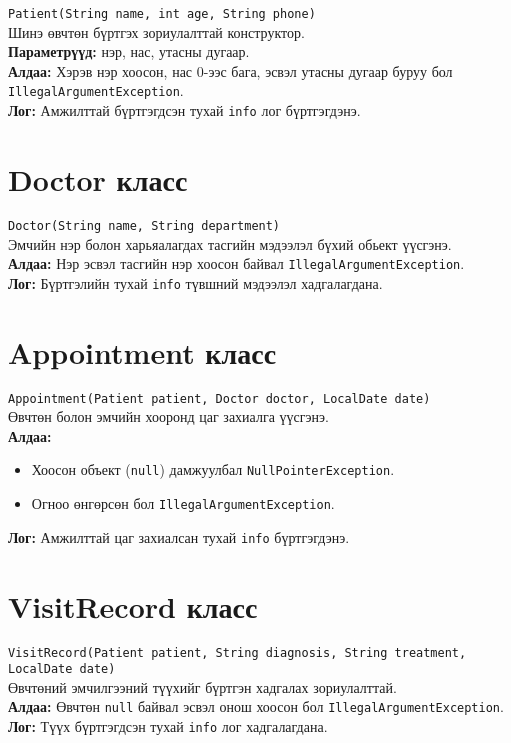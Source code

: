 \documentclass[12pt]{article}
\begin{document}
\texttt{Patient(String name, int age, String phone)} \\
Шинэ өвчтөн бүртгэх зориулалттай конструктор. \\
\textbf{Параметрүүд:} нэр, нас, утасны дугаар. \\
\textbf{Алдаа:} Хэрэв нэр хоосон, нас 0-ээс бага, эсвэл утасны дугаар буруу бол \texttt{IllegalArgumentException}. \\
\textbf{Лог:} Амжилттай бүртгэгдсэн тухай \texttt{info} лог бүртгэгдэнэ.

\section*{Doctor класс}

\texttt{Doctor(String name, String department)} \\
Эмчийн нэр болон харьяалагдах тасгийн мэдээлэл бүхий обьект үүсгэнэ. \\
\textbf{Алдаа:} Нэр эсвэл тасгийн нэр хоосон байвал \texttt{IllegalArgumentException}. \\
\textbf{Лог:} Бүртгэлийн тухай \texttt{info} түвшний мэдээлэл хадгалагдана.

\section*{Appointment класс}

\texttt{Appointment(Patient patient, Doctor doctor, LocalDate date)} \\
Өвчтөн болон эмчийн хооронд цаг захиалга үүсгэнэ. \\
\textbf{Алдаа:}
\begin{itemize}
    \item Хоосон объект (\texttt{null}) дамжуулбал \texttt{NullPointerException}.
    \item Огноо өнгөрсөн бол \texttt{IllegalArgumentException}.
\end{itemize}
\textbf{Лог:} Амжилттай цаг захиалсан тухай \texttt{info} бүртгэгдэнэ.

\section*{VisitRecord класс}

\texttt{VisitRecord(Patient patient, String diagnosis, String treatment, LocalDate date)} \\
Өвчтөний эмчилгээний түүхийг бүртгэн хадгалах зориулалттай. \\
\textbf{Алдаа:} Өвчтөн \texttt{null} байвал эсвэл онош хоосон бол \texttt{IllegalArgumentException}. \\
\textbf{Лог:} Түүх бүртгэгдсэн тухай \texttt{info} лог хадгалагдана.
\end{document}
